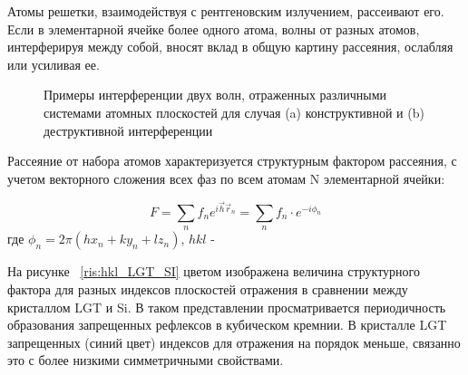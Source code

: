 \label{sec:structure_factor}
Атомы решетки, взаимодействуя с рентгеновским излучением, рассеивают его.
Если в элементарной ячейке более одного атома, волны от разных атомов,
 интерферируя между собой, вносят вклад в общую картину рассеяния,
 ослабляя или усиливая ее.

 \begin{figure}[H]
   \centering
   \hfill
   \caption{Примеры интерференции двух волн, отраженных различными системами атомных плоскостей для случая
   (a) конструктивной и (b) деструктивной интерференции}
   \label{ris:interference_by_plate}
 \end{figure}

Рассеяние от набора атомов характеризуется структурным фактором рассеяния,
 с учетом векторного сложения всех фаз по всем атомам N элементарной ячейки:

 \begin{equation}
   F = \sum_{n} f_n e^{ i\vec{h}\vec{r}_n} =   \sum_{n} f_n \cdot e^{-i\phi_n}
  \end{equation}
\noindent
где $\phi_n = 2 \pi (hx_n+ky_n+lz_n)$,  $hkl$ - 


На рисунке ~\ref{ris:hkl_LGT_SI} цветом изображена величина структурного фактора для разных
 индексов плоскостей отражения в сравнении между кристаллом LGT и Si.
 В таком представлении просматривается периодичность образования запрещенных
 рефлексов в кубическом кремнии. В кристалле LGT запрещенных (синий цвет)
  индексов для отражения на порядок меньше, связанно это с более низкими
  симметричными свойствами.

